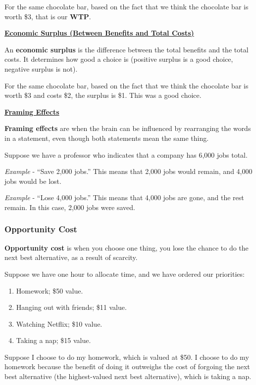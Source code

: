 For the same chocolate bar, based on the fact that we think the chocolate bar is worth \$3, that is our \textbf{WTP}.

\underline{\textbf{Economic Surplus (Between Benefits and Total Costs)}}

An \textbf{economic surplus} is the difference between the total benefits and the total costs. It determines how good a choice is (positive surplus is a good choice, negative surplus is not).

For the same chocolate bar, based on the fact that we think the chocolate bar is worth \$3 and costs \$2, the surplus is \$1. This was a good choice.

\underline{\textbf{Framing Effects}}

\textbf{Framing effects} are when the brain can be influenced by rearranging the words in a statement, even though both statements mean the same thing.

Suppose we have a professor who indicates that a company has 6,000 jobs total.

\textit{Example} - ``Save 2,000 jobs.'' This means that 2,000 jobs would remain, and 4,000 jobs would be lost.

\textit{Example} - ``Lose 4,000 jobs.'' This means that 4,000 jobs are gone, and the rest remain. In this case, 2,000 jobs were saved.

\subsubsection{Opportunity Cost}

\textbf{Opportunity cost} is when you choose one thing, you lose the chance to do the next best alternative, as a result of scarcity.

Suppose we have one hour to allocate time, and we have ordered our priorities:

\begin{enumerate}
    \item Homework; \$50 value.
    \item Hanging out with friends; \$11 value.
    \item Watching Netflix; \$10 value.
    \item Taking a nap; \$15 value.
\end{enumerate}

Suppose I choose to do my homework, which is valued at \$50. I choose to do my homework because the benefit of doing it outweighs the cost of forgoing the next best alternative (the highest-valued next best alternative), which is taking a nap.

